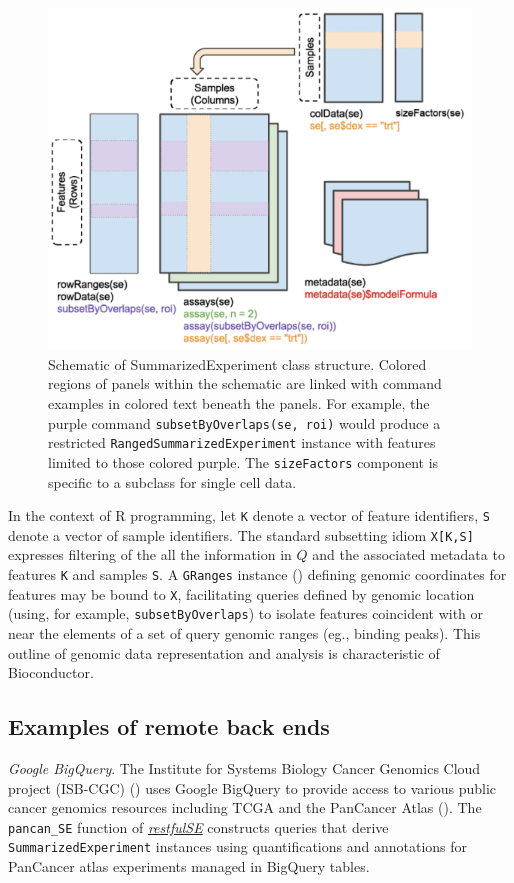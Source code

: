 \documentclass[9pt,a4paper,]{extarticle}
\begin{document}
\begin{figure}[h]

{\centering \includegraphics[width=0.6\linewidth]{seSchema} 

}

\caption{Schematic of SummarizedExperiment class structure.  Colored regions of panels within the schematic are linked with command examples in colored text beneath the panels.  For example, the purple command \texttt{subsetByOverlaps(se, roi)} would produce a restricted \texttt{RangedSummarizedExperiment} instance with features limited to those colored purple.  The \texttt{sizeFactors} component is specific to a subclass for single cell data.}\label{fig:seSchema}
\end{figure}

In the context of R programming, let
\texttt{K} denote a vector of feature identifiers,
\texttt{S} denote a vector of sample identifiers.
The standard subsetting idiom \texttt{X{[}K,S{]}} expresses filtering of
the all the information in \(Q\) and the associated metadata
to features \texttt{K} and samples \texttt{S}. A \texttt{GRanges}
instance (\citet{Lawrence2013}) defining genomic coordinates
for features may be bound to \texttt{X},
facilitating queries defined by genomic location (using, for example, \texttt{subsetByOverlaps}) to isolate features
coincident with or near the elements of a set of query genomic ranges (eg., binding peaks). This outline of genomic data representation
and analysis is characteristic of Bioconductor.

\subsection{Examples of remote back ends}\label{examples-of-remote-back-ends}

\emph{Google BigQuery}. The Institute for Systems Biology Cancer
Genomics Cloud project (ISB-CGC) (\citet{ISBCGC}) uses
Google BigQuery to provide access to
various public cancer genomics resources including
TCGA and the PanCancer Atlas (\citet{Hoadley2018}).
The \texttt{pancan\_SE}
function of \emph{\href{https://bioconductor.org/packages/3.9/restfulSE}{restfulSE}} constructs queries that derive
\texttt{SummarizedExperiment} instances using quantifications and annotations
for PanCancer atlas experiments
managed in BigQuery tables.
\end{document}
